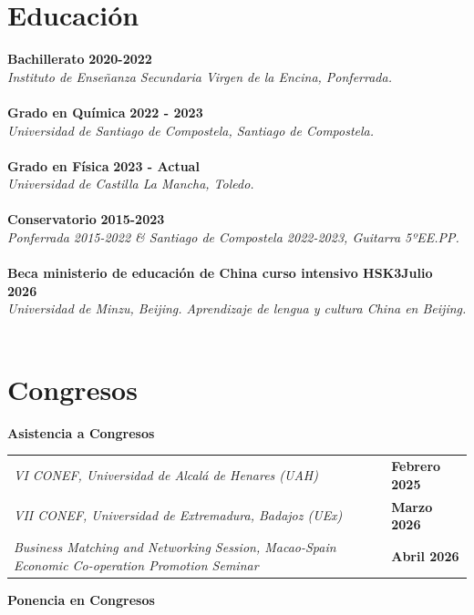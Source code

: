 \documentclass[11pt,a4paper]{article}
\begin{document}
\section*{Educación}

\noindent\textbf{Bachillerato} \hfill \textbf{2020-2022}\\
\textit{Instituto de Enseñanza Secundaria Virgen de la Encina, Ponferrada.}\\
\\
\textbf{Grado en Química} \hfill \textbf{2022 - 2023} \\
\textit{Universidad de Santiago de Compostela, Santiago de Compostela.} \\
\\
\textbf{Grado en Física} \hfill \textbf{2023 - Actual} \\
\textit{Universidad de Castilla La Mancha, Toledo.} \\
\\
\textbf{Conservatorio} \hfill \textbf{2015-2023}\\
\textit{Ponferrada 2015-2022 \& Santiago de Compostela 2022-2023, Guitarra 5ºEE.PP.}\\
\\
\textbf{Beca ministerio de educación de China curso intensivo HSK3}\hfill\textbf{Julio 2026}\\
\textit{Universidad de Minzu, Beijing. Aprendizaje de lengua y cultura China en Beijing.}\\
\\
\section*{Congresos}

\noindent\textbf{Asistencia a Congresos}\par\smallskip

\noindent
\begin{tabularx}{\textwidth}{@{}X >{\raggedleft\arraybackslash\bfseries}p{2.8cm}@{}}
\textit{VI CONEF, Universidad de Alcalá de Henares (UAH)} & Febrero 2025 \\[2pt]
\textit{VII CONEF, Universidad de Extremadura, Badajoz (UEx)} & Marzo 2026 \\[2pt]
\textit{Business Matching and Networking Session, Macao-Spain Economic Co-operation Promotion Seminar} & Abril 2026 \\[2pt]
\end{tabularx}
\noindent\textbf{Ponencia en Congresos}\par\smallskip
\end{document}
